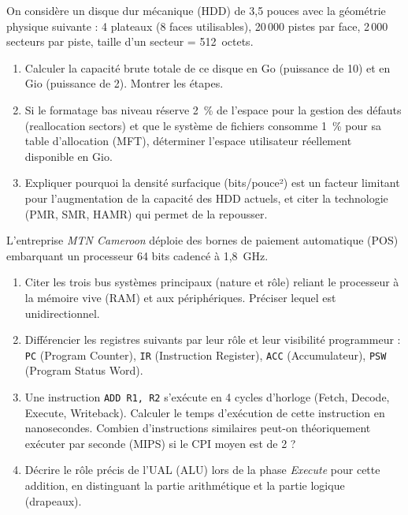 \documentclass[11pt]{article}
\begin{document}
\begin{exercice}
On considère un disque dur mécanique (HDD) de 3,5 pouces avec la géométrie physique suivante : 4 plateaux (8 faces utilisables), 20\,000 pistes par face, 2\,000 secteurs par piste, taille d'un secteur = 512~octets.
\begin{enumerate}
    \item Calculer la capacité brute totale de ce disque en Go (puissance de 10) et en Gio (puissance de 2). Montrer les étapes.
    \item Si le formatage bas niveau réserve 2~\% de l'espace pour la gestion des défauts (reallocation sectors) et que le système de fichiers consomme 1~\% pour sa table d'allocation (MFT), déterminer l'espace utilisateur réellement disponible en Gio.
    \item Expliquer pourquoi la densité surfacique (bits/pouce²) est un facteur limitant pour l'augmentation de la capacité des HDD actuels, et citer la technologie (PMR, SMR, HAMR) qui permet de la repousser.
\end{enumerate}
\end{exercice}

\begin{exercice}
L'entreprise \textit{MTN Cameroon} déploie des bornes de paiement automatique (POS) embarquant un processeur 64 bits cadencé à 1,8~GHz.
\begin{enumerate}
    \item Citer les trois bus systèmes principaux (nature et rôle) reliant le processeur à la mémoire vive (RAM) et aux périphériques. Préciser lequel est unidirectionnel.
    \item Différencier les registres suivants par leur rôle et leur visibilité programmeur : \texttt{PC} (Program Counter), \texttt{IR} (Instruction Register), \texttt{ACC} (Accumulateur), \texttt{PSW} (Program Status Word).
    \item Une instruction \texttt{ADD R1, R2} s'exécute en 4 cycles d'horloge (Fetch, Decode, Execute, Writeback). Calculer le temps d'exécution de cette instruction en nanosecondes. Combien d'instructions similaires peut-on théoriquement exécuter par seconde (MIPS) si le CPI moyen est de 2 ?
    \item Décrire le rôle précis de l'UAL (ALU) lors de la phase \textit{Execute} pour cette addition, en distinguant la partie arithmétique et la partie logique (drapeaux).
\end{enumerate}
\end{exercice}
\end{document}
